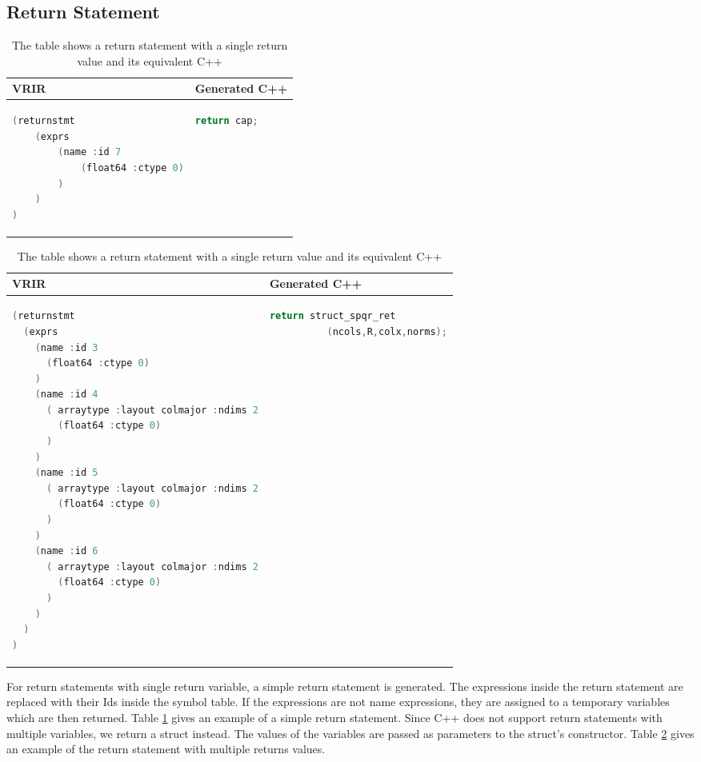 \subsection{Return Statement}
\begin{table}[htbp]
\centering
\begin{tabular}{|l|l|}
\hline

VRIR &  Generated C++ \\
\hline
{
\begin{lstlisting}[language=c,frame=none, numbers=none]
(returnstmt
	(exprs
		(name :id 7
			(float64 :ctype 0)
		)
	)
)
\end{lstlisting}
}
&
{
\begin{lstlisting}[language=c,frame=none, numbers=none]
return cap;
\end{lstlisting}
} \\
\hline
\end{tabular}
\caption[Simple return statement]{The table shows a return statement with a single return value and its equivalent C++}
\label{tab:simpleReturn}
\end{table}
\begin{table}[htbp]
\centering
\begin{tabular}{|l|l|}
\hline

VRIR &  Generated C++ \\
\hline
{
\begin{lstlisting}[language=c,frame=none, numbers=none]
(returnstmt
  (exprs
    (name :id 3
      (float64 :ctype 0)
    )
    (name :id 4
      ( arraytype :layout colmajor :ndims 2
        (float64 :ctype 0)
      )
    )
    (name :id 5
      ( arraytype :layout colmajor :ndims 2
        (float64 :ctype 0)
      )
    )
    (name :id 6
      ( arraytype :layout colmajor :ndims 2
        (float64 :ctype 0)
      )
    )
  )
)
\end{lstlisting}
}
&
{
\begin{lstlisting}[language=c,frame=none, numbers=none]
return struct_spqr_ret
          (ncols,R,colx,norms);
\end{lstlisting}
} \\
\hline
\end{tabular}
\caption[Simple return statement]{The table shows a return statement with a single return value and its equivalent C++}
\label{tab:multiReturn}
\end{table}
For return statements with single return variable, a simple return statement is generated. The expressions inside the return statement are replaced with their Ids inside the symbol table. If the expressions are not name expressions, they are assigned to a temporary variables which are then returned. Table \ref{tab:simpleReturn} gives an example of a simple return statement.
Since C++ does not support return statements with multiple variables, we return a struct instead. The values of the variables are passed as parameters to the struct's constructor. Table \ref{tab:multiReturn} gives an example of the return statement with multiple returns values.
